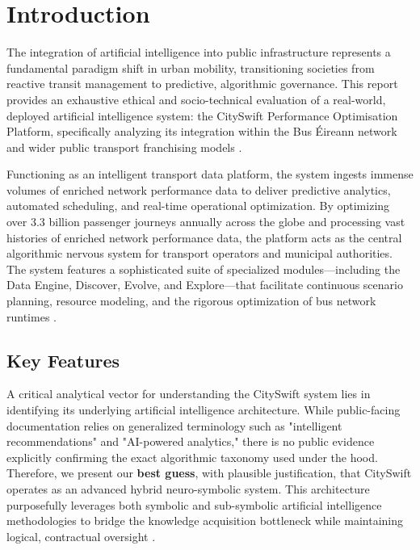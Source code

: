 \documentclass[]
{UCD_CS_41820_Report}
\begin{document}
\maketitle


\tableofcontents


\chapter{Introduction}
The integration of artificial intelligence into public infrastructure represents a fundamental paradigm shift in urban mobility, transitioning societies from reactive transit management to predictive, algorithmic governance. This report provides an exhaustive ethical and socio-technical evaluation of a real-world, deployed artificial intelligence system: the CitySwift Performance Optimisation Platform, specifically analyzing its integration within the Bus Éireann network and wider public transport franchising models \cite{cityswift_bus_eireann}.

Functioning as an intelligent transport data platform, the system ingests immense volumes of enriched network performance data to deliver predictive analytics, automated scheduling, and real-time operational optimization. By optimizing over 3.3 billion passenger journeys annually across the globe \cite{galwaybayfm_cityswift} and processing vast histories of enriched network performance data, the platform acts as the central algorithmic nervous system for transport operators and municipal authorities. The system features a sophisticated suite of specialized modules—including the Data Engine, Discover, Evolve, and Explore—that facilitate continuous scenario planning, resource modeling, and the rigorous optimization of bus network runtimes \cite{cityswift_gov_uk}.

\section*{Key Features}
A critical analytical vector for understanding the CitySwift system lies in identifying its underlying artificial intelligence architecture. While public-facing documentation relies on generalized terminology such as "intelligent recommendations" and "AI-powered analytics," there is no public evidence explicitly confirming the exact algorithmic taxonomy used under the hood. Therefore, we present our \textbf{best guess}, with plausible justification, that CitySwift operates as an advanced hybrid neuro-symbolic system. This architecture purposefully leverages both symbolic and sub-symbolic artificial intelligence methodologies to bridge the knowledge acquisition bottleneck while maintaining logical, contractual oversight \cite{intro_machine_ethics}.
\end{document}
